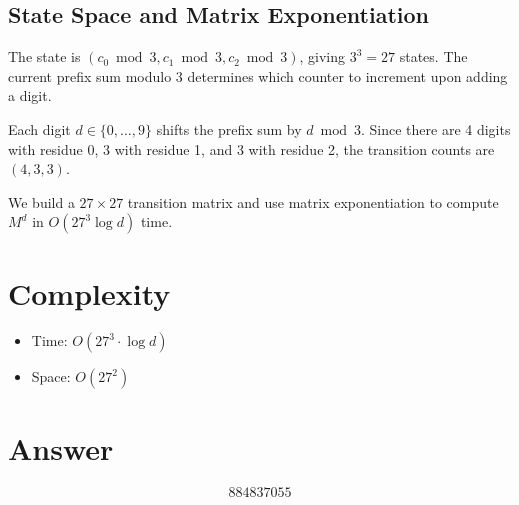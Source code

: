 \documentclass[12pt]{article}
\begin{document}
\subsection{State Space and Matrix Exponentiation}
The state is $(c_0 \bmod 3, c_1 \bmod 3, c_2 \bmod 3)$, giving $3^3 = 27$ states. The current prefix sum modulo 3 determines which counter to increment upon adding a digit.

Each digit $d \in \{0,\ldots,9\}$ shifts the prefix sum by $d \bmod 3$. Since there are 4 digits with residue 0, 3 with residue 1, and 3 with residue 2, the transition counts are $(4, 3, 3)$.

We build a $27 \times 27$ transition matrix and use matrix exponentiation to compute $M^{d}$ in $O(27^3 \log d)$ time.

\section{Complexity}
\begin{itemize}
    \item Time: $O(27^3 \cdot \log d)$
    \item Space: $O(27^2)$
\end{itemize}

\section{Answer}

\[
\boxed{884837055}
\]
\end{document}
